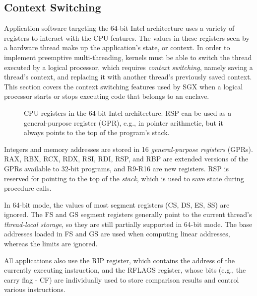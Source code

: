\subsection{Context Switching}
\label{sec:registers}

Application software targeting the 64-bit Intel architecture uses a variety of
registers to interact with the CPU features. The values in these registers
seen by a hardware thread make up the application's state, or context. In order
to implement preemptive multi-threading, kernels must be able to switch the
thread executed by a logical processor, which requires \textit{context
switching}, namely saving a thread's context, and replacing it with another
thread's previously saved context. This section covers the context switching
features used by SGX when a logical processor starts or stops executing code
that belongs to an enclave.

\begin{figure}[hbt]
  \caption{
    CPU registers in the 64-bit Intel architecture. RSP can be used as a
    general-purpose register (GPR), e.g., in pointer arithmetic, but it always
    points to the top of the program's stack.
  }
  \label{fig:cpu_registers}
\end{figure}

Integers and memory addresses are stored in 16 \textit{general-purpose
registers} (GPRs). RAX, RBX, RCX, RDX, RSI, RDI, RSP, and RBP are extended
versions of the GPRs available to 32-bit programs, and R9-R16 are new
registers. RSP is reserved for pointing to the top of the \textit{stack}, which
is used to save state during procedure calls.

In 64-bit mode, the values of most segment registers (CS, DS, ES, SS) are
ignored. The FS and GS segment registers generally point to the current
thread's \textit{thread-local storage}, so they are still partially supported
in 64-bit mode. The base addresses loaded in FS and GS are used when computing
linear addresses, whereas the limits are ignored.

All applications also use the RIP register, which contains the address of the
currently executing instruction, and the RFLAGS register, whose bits (e.g.,
the carry flag - CF) are individually used to store comparison results and
control various instructions.

